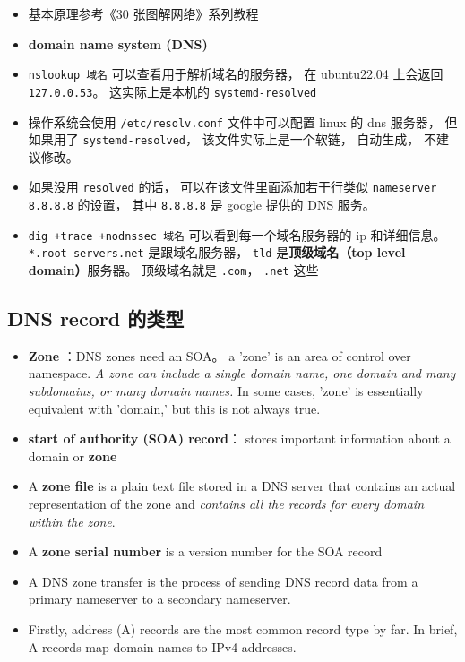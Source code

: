 
\begin{itemize}
\item 基本原理参考《30 张图解网络》系列教程
\item \textbf{domain name system (DNS)}
\item \verb|nslookup 域名| 可以查看用于解析域名的服务器， 在 ubuntu22.04 上会返回 \verb|127.0.0.53|。 这实际上是本机的 \verb|systemd-resolved|
\item 操作系统会使用 \verb|/etc/resolv.conf| 文件中可以配置 linux 的 dns 服务器， 但如果用了 \verb|systemd-resolved|， 该文件实际上是一个软链， 自动生成， 不建议修改。
\item 如果没用 \verb|resolved| 的话， 可以在该文件里面添加若干行类似 \verb|nameserver 8.8.8.8| 的设置， 其中 \verb|8.8.8.8| 是 google 提供的 DNS 服务。
\item \verb|dig +trace +nodnssec 域名| 可以看到每一个域名服务器的 ip 和详细信息。 \verb|*.root-servers.net| 是跟域名服务器， \verb|tld| 是\textbf{顶级域名（top level domain）}服务器。 顶级域名就是 \verb|.com|， \verb|.net| 这些
\end{itemize}

\subsection{DNS record 的类型}
\begin{itemize}
\item \textbf{Zone} ：DNS zones need an SOA。 a 'zone' is an area of control over namespace. \textsl{A zone can include a single domain name, one domain and many subdomains, or many domain names.} In some cases, 'zone' is essentially equivalent with 'domain,' but this is not always true.
\item \textbf{start of authority (SOA) record}： stores important information about a domain or \textbf{zone}
\item A \textbf{zone file} is a plain text file stored in a DNS server that contains an actual representation of the zone and \textsl{contains all the records for every domain within the zone}.
\item A \textbf{zone serial number} is a version number for the SOA record
\item A DNS zone transfer is the process of sending DNS record data from a primary nameserver to a secondary nameserver.
\item Firstly, address (A) records are the most common record type by far. In brief, A records map domain names to IPv4 addresses.
\end{itemize}
